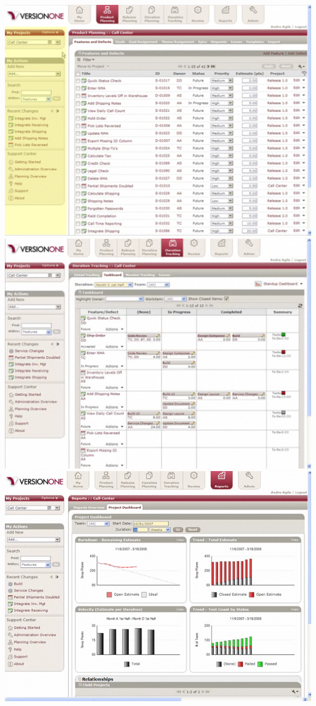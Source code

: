 \begin{itemize}
\includegraphics[scale=0.3]{images/version_one_1.png}
\includegraphics[scale=0.3]{images/version_one_2.png}
\includegraphics[scale=0.4]{images/version_one_3.png}

\end{itemize}
